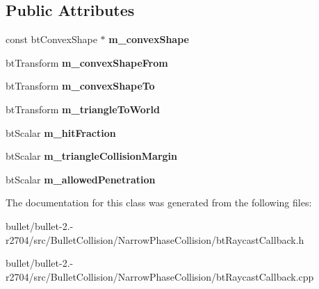 \subsection*{Public Attributes}
\begin{DoxyCompactItemize}
\item 
\hypertarget{classbt_triangle_convexcast_callback_a8431c9286e2157ba4fa955f20efd4856}{const bt\+Convex\+Shape $\ast$ {\bfseries m\+\_\+convex\+Shape}}\label{classbt_triangle_convexcast_callback_a8431c9286e2157ba4fa955f20efd4856}

\item 
\hypertarget{classbt_triangle_convexcast_callback_aab60a7be21e4fd6c8139bb2570637804}{bt\+Transform {\bfseries m\+\_\+convex\+Shape\+From}}\label{classbt_triangle_convexcast_callback_aab60a7be21e4fd6c8139bb2570637804}

\item 
\hypertarget{classbt_triangle_convexcast_callback_a5dcc11b83390358d62115e26595b369d}{bt\+Transform {\bfseries m\+\_\+convex\+Shape\+To}}\label{classbt_triangle_convexcast_callback_a5dcc11b83390358d62115e26595b369d}

\item 
\hypertarget{classbt_triangle_convexcast_callback_a52e81f79e5164a46df5ae43bece29eb5}{bt\+Transform {\bfseries m\+\_\+triangle\+To\+World}}\label{classbt_triangle_convexcast_callback_a52e81f79e5164a46df5ae43bece29eb5}

\item 
\hypertarget{classbt_triangle_convexcast_callback_a51408b7878294c6255bcbf522df49971}{bt\+Scalar {\bfseries m\+\_\+hit\+Fraction}}\label{classbt_triangle_convexcast_callback_a51408b7878294c6255bcbf522df49971}

\item 
\hypertarget{classbt_triangle_convexcast_callback_ac10d5afa47d0ccd2fa5446569962b39f}{bt\+Scalar {\bfseries m\+\_\+triangle\+Collision\+Margin}}\label{classbt_triangle_convexcast_callback_ac10d5afa47d0ccd2fa5446569962b39f}

\item 
\hypertarget{classbt_triangle_convexcast_callback_ae093478803bf03fa70e45bec053c765e}{bt\+Scalar {\bfseries m\+\_\+allowed\+Penetration}}\label{classbt_triangle_convexcast_callback_ae093478803bf03fa70e45bec053c765e}

\end{DoxyCompactItemize}


The documentation for this class was generated from the following files\+:\begin{DoxyCompactItemize}
\item 
bullet/bullet-\/2.-\/r2704/src/\+Bullet\+Collision/\+Narrow\+Phase\+Collision/bt\+Raycast\+Callback.\+h\item 
bullet/bullet-\/2.-\/r2704/src/\+Bullet\+Collision/\+Narrow\+Phase\+Collision/bt\+Raycast\+Callback.\+cpp\end{DoxyCompactItemize}
